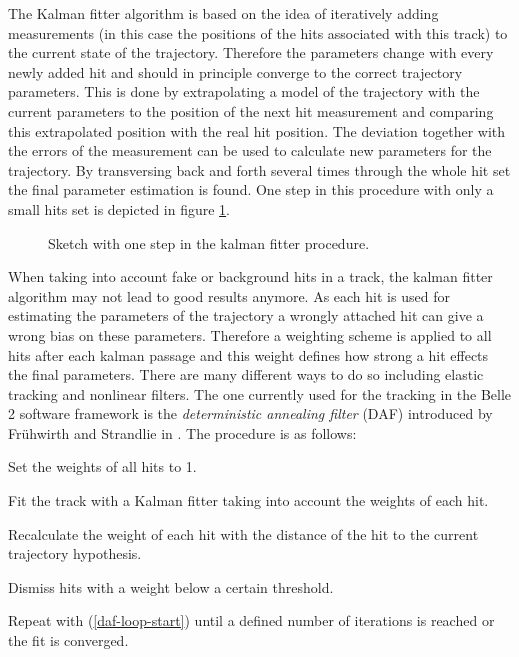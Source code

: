 The Kalman fitter algorithm \cite{kalman} is based on the idea of iteratively adding measurements (in this case the positions of the hits associated with this track) to the current state of the trajectory. Therefore the parameters change with every newly added hit and should in principle converge to the correct trajectory parameters. This is done by extrapolating a model of the trajectory with the current parameters to the position of the next hit measurement and comparing this extrapolated position with the real hit position. The deviation together with the errors of the measurement can be used to calculate new parameters for the trajectory. By transversing back and forth several times through the whole hit set the final parameter estimation is found. One step in this procedure with only a small hits set is depicted in figure \ref{fig-kalman}.

\begin{figure}
 \caption{Sketch with one step in the kalman fitter procedure.}
 \label{fig-kalman}
\end{figure}

When taking into account fake or background hits in a track, the kalman fitter algorithm may not lead to good results anymore. As each hit is used for estimating the parameters of the trajectory a wrongly attached hit can give a wrong bias on these parameters. Therefore a weighting scheme is applied to all hits after each kalman passage and this weight defines how strong a hit effects the final parameters. There are many different ways to do so including elastic tracking and nonlinear filters. The one currently used for the tracking in the Belle 2 software framework is the \emph{deterministic annealing filter} (DAF) introduced by Frühwirth and Strandlie in \cite{daf_fruh}. The procedure is as follows:
\begin{zlist}
  \item Set the weights of all hits to 1.
  \item Fit the track with a Kalman fitter taking into account the weights of each hit. \label{daf-loop-start}
  \item Recalculate the weight of each hit with the distance of the hit to the current trajectory hypothesis.
  \item Dismiss hits with a weight below a certain threshold.
  \item Repeat with (\ref{daf-loop-start}) until a defined number of iterations is reached or the fit is converged.
\end{zlist}

